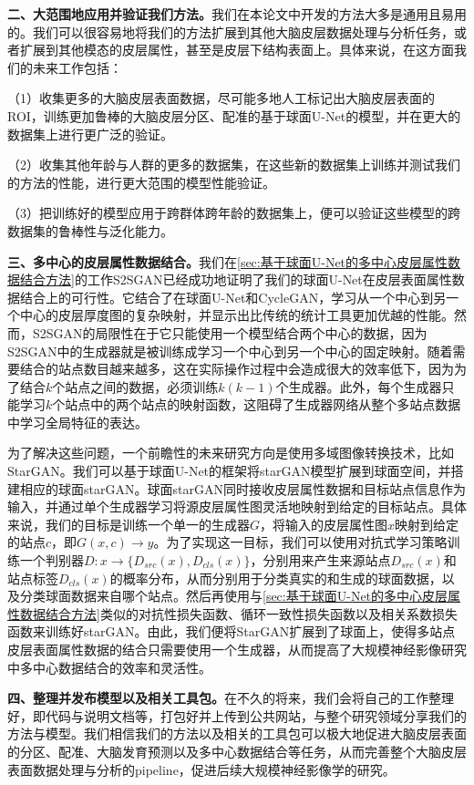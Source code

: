 \textbf{二、大范围地应用并验证我们方法。}我们在本论文中开发的方法大多是通用且易用的。我们可以很容易地将我们的方法扩展到其他大脑皮层数据处理与分析任务，或者扩展到其他模态的皮层属性，甚至是皮层下结构表面上。具体来说，在这方面我们的未来工作包括：

（1）收集更多的大脑皮层表面数据，尽可能多地人工标记出大脑皮层表面的ROI，训练更加鲁棒的大脑皮层分区、配准的基于球面U-Net的模型，并在更大的数据集上进行更广泛的验证。

（2）收集其他年龄与人群的更多的数据集，在这些新的数据集上训练并测试我们的方法的性能，进行更大范围的模型性能验证。

（3）把训练好的模型应用于跨群体跨年龄的数据集上，便可以验证这些模型的跨数据集的鲁棒性与泛化能力。

\textbf{三、多中心的皮层属性数据结合。}我们在\ref{sec:基于球面U-Net的多中心皮层属性数据结合方法}的工作S2SGAN已经成功地证明了我们的球面U-Net在皮层表面属性数据结合上的可行性。它结合了在球面U-Net和CycleGAN，学习从一个中心到另一个中心的皮层厚度图的复杂映射，并显示出比传统的统计工具更加优越的性能。然而，S2SGAN的局限性在于它只能使用一个模型结合两个中心的数据，因为S2SGAN中的生成器就是被训练成学习一个中心到另一个中心的固定映射。随着需要结合的站点数目越来越多，这在实际操作过程中会造成很大的效率低下，因为为了结合$k$个站点之间的数据，必须训练$k(k-1)$个生成器。此外，每个生成器只能学习$k$个站点中的两个站点的映射函数，这阻碍了生成器网络从整个多站点数据中学习全局特征的表达。

为了解决这些问题，一个前瞻性的未来研究方向是使用多域图像转换技术，比如StarGAN\cite{choi2018stargan}。我们可以基于球面U-Net的框架将starGAN模型扩展到球面空间，并搭建相应的球面starGAN。球面starGAN同时接收皮层属性数据和目标站点信息作为输入，并通过单个生成器学习将源皮层属性图灵活地映射到给定的目标站点。具体来说，我们的目标是训练一个单一的生成器$G$，将输入的皮层属性图$x$映射到给定的站点$c$，即$G(x,c)\rightarrow y$。为了实现这一目标，我们可以使用对抗式学习策略\cite{goodfellow2014generative}训练一个判别器$D:x\rightarrow \{D_{src}(x),D_{cls}(x)\}$，分别用来产生来源站点$D_{src}(x)$和站点标签$D_{cls}(x)$的概率分布，从而分别用于分类真实的和生成的球面数据，以及分类球面数据来自哪个站点。然后再使用与\ref{sec:基于球面U-Net的多中心皮层属性数据结合方法}类似的对抗性损失函数、循环一致性损失函数以及相关系数损失函数来训练好starGAN。由此，我们便将StarGAN扩展到了球面上，使得多站点皮层表面属性数据的结合只需要使用一个生成器，从而提高了大规模神经影像研究中多中心数据结合的效率和灵活性。

\textbf{四、整理并发布模型以及相关工具包。}在不久的将来，我们会将自己的工作整理好，即代码与说明文档等，打包好并上传到公共网站，与整个研究领域分享我们的方法与模型。我们相信我们的方法以及相关的工具包可以极大地促进大脑皮层表面的分区、配准、大脑发育预测以及多中心数据结合等任务，从而完善整个大脑皮层表面数据处理与分析的pipeline，促进后续大规模神经影像学的研究。